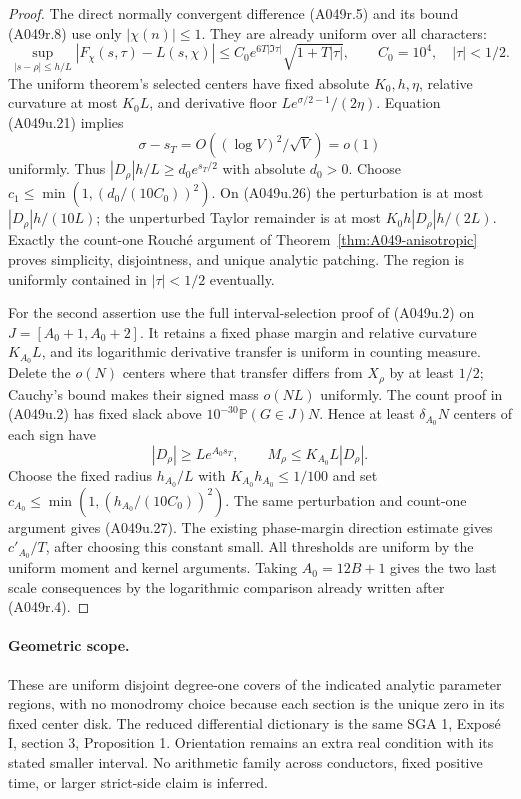 \begin{proof}
The direct normally convergent difference (A049r.5)
and its bound (A049r.8) use only $|\chi(n)|\le1$.
They are already uniform over all characters:
\[
 \sup_{|s-\rho|\le h/L}|F_\chi(s,\tau)-L(s,\chi)|
       \le C_0e^{6T|\Im\tau|}\sqrt{1+T|\tau|},
       \qquad C_0=10^4,\quad |\tau|<1/2 .
\]
The uniform theorem's selected centers have fixed
absolute $K_0,h,\eta$, relative curvature at most
$K_0L$, and derivative floor
$L e^{\sigma/2-1}/(2\eta)$.
Equation (A049u.21) implies
\[
 \sigma-s_T=O((\log V)^2/\sqrt V)=o(1)
\]
uniformly. Thus $|D_\rho|h/L\ge d_0e^{s_T/2}$ with
absolute $d_0>0$. Choose
$c_1\le\min(1,(d_0/(10C_0))^2)$.
On (A049u.26) the perturbation is at most
$|D_\rho|h/(10L)$; the unperturbed Taylor remainder
is at most $K_0h|D_\rho|h/(2L)$.
Exactly the count-one Rouch\'e argument of
Theorem~\ref{thm:A049-anisotropic} proves simplicity,
disjointness, and unique analytic patching. The region
is uniformly contained in $|\tau|<1/2$ eventually.

For the second assertion use the full interval-selection
proof of (A049u.2) on $J=[A_0+1,A_0+2]$.
It retains a fixed phase margin and relative curvature
$K_{A_0}L$, and its logarithmic derivative transfer is
uniform in counting measure. Delete the $o(N)$ centers
where that transfer differs from $X_\rho$ by at least
$1/2$; Cauchy's bound makes their signed mass $o(NL)$
uniformly. The count proof in (A049u.2) has fixed slack
above $10^{-30}\mathbb P(G\in J)N$.
Hence at least $\delta_{A_0}N$ centers of each sign have
\[
       |D_\rho|\ge Le^{A_0s_T},\qquad
       M_\rho\le K_{A_0}L|D_\rho|.
\]
Choose the fixed radius $h_{A_0}/L$ with
$K_{A_0}h_{A_0}\le1/100$ and set
$c_{A_0}\le\min(1,(h_{A_0}/(10C_0))^2)$.
The same perturbation and count-one argument gives
(A049u.27). The existing phase-margin direction estimate
gives $c'_{A_0}/T$, after choosing this constant small.
All thresholds are uniform by the uniform moment and
kernel arguments. Taking $A_0=12B+1$ gives the two
last scale consequences by the logarithmic comparison
already written after (A049r.4).
\end{proof}

\paragraph{Geometric scope.}
These are uniform disjoint degree-one covers of the
indicated analytic parameter regions, with no monodromy
choice because each section is the unique zero in its
fixed center disk. The reduced differential dictionary
is the same SGA 1, Expos\'e I, section 3, Proposition 1.
Orientation remains an extra real condition with its
stated smaller interval. No arithmetic family across
conductors, fixed positive time, or larger strict-side
claim is inferred.


